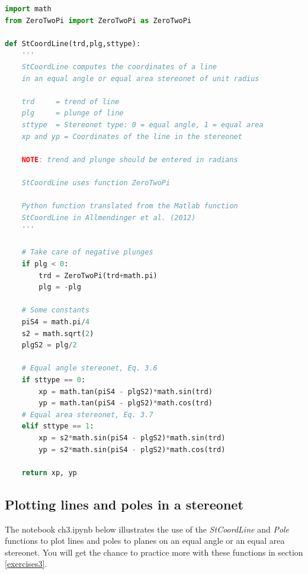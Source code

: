 \documentclass[a4paper , 12pt]{book}
\begin{document}
\begin{center}
\begin{lstlisting}[language=Python, frame=single]
import math
from ZeroTwoPi import ZeroTwoPi as ZeroTwoPi

def StCoordLine(trd,plg,sttype):
    '''
    StCoordLine computes the coordinates of a line 
    in an equal angle or equal area stereonet of unit radius
    
    trd  	= trend of line
    plg  	= plunge of line
    sttype 	= Stereonet type: 0 = equal angle, 1 = equal area
    xp and yp = Coordinates of the line in the stereonet

    NOTE: trend and plunge should be entered in radians

    StCoordLine uses function ZeroTwoPi
    
    Python function translated from the Matlab function 
    StCoordLine in Allmendinger et al. (2012)
    '''
    
    # Take care of negative plunges
    if plg < 0:
        trd = ZeroTwoPi(trd+math.pi)
        plg = -plg
        
    # Some constants
    piS4 = math.pi/4
    s2 = math.sqrt(2)
    plgS2 = plg/2
        
    # Equal angle stereonet, Eq. 3.6
    if sttype == 0:
        xp = math.tan(piS4 - plgS2)*math.sin(trd)
        yp = math.tan(piS4 - plgS2)*math.cos(trd)
    # Equal area stereonet, Eq. 3.7
    elif sttype == 1:
        xp = s2*math.sin(piS4 - plgS2)*math.sin(trd)
        yp = s2*math.sin(piS4 - plgS2)*math.cos(trd)
    
    return xp, yp
\end{lstlisting}   
\end{center}

\subsection{Plotting lines and poles in a stereonet}
The notebook ch3.ipynb below illustrates the use of the \textit{StCoordLine} and \textit{Pole} functions to plot lines and poles to planes on an equal angle or an equal area stereonet. You will get the chance to practice more with these functions in section \ref{exercises3}.
\end{document}
